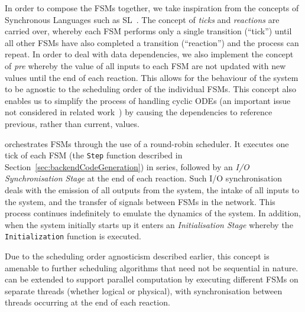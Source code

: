 In order to compose the \acp{FSM} together, we take inspiration
from the concepts of Synchronous Languages such as SL~\cite{SlLanguage}.  The 
concept of \emph{ticks} and \emph{reactions} are carried over, whereby each 
\ac{FSM} performs 
only a single transition (``tick'') until all other \acp{FSM} have also 
completed a transition (``reaction'') and the process can repeat.  In order to
deal with data dependencies, we also implement the concept of \emph{pre}
whereby the value of all inputs to each \ac{FSM} are not updated with
new values until the end of each reaction.  This allows for the behaviour of 
the system to be agnostic to the scheduling order of the individual 
\acp{FSM}.  This concept also enables us to simplify the process of 
handling cyclic \acp{ODE} (an important issue not considered in related 
work~\cite{kim2003modular}) by causing the dependencies to reference
previous, rather than current, values.

\ourTool orchestrates \acp{FSM} through the use of a round-robin
scheduler.  It executes one tick of each \ac{FSM} (the \texttt{Step} function 
described in Section~\ref{sec:backendCodeGeneration}) in series, followed by an 
\emph{I/O Synchronisation Stage} at the end of each reaction.  Such I/O 
synchronisation deals with the emission of all outputs from the system, the 
intake of all inputs to the system, and the transfer of signals between 
\acp{FSM} in the network.  This process continues indefinitely to emulate the 
dynamics of the system.  In addition, when the system initially starts up it 
enters an \emph{Initialisation Stage} whereby the \texttt{Initialization} 
function is executed.

Due to the scheduling order agnosticism described earlier, this concept is 
amenable to further scheduling algorithms that need not be sequential in 
nature.  \ourTool can be extended to support parallel computation by executing 
different \acp{FSM} on separate threads (whether logical or physical), with 
synchronisation between threads occurring at the end of each reaction.
